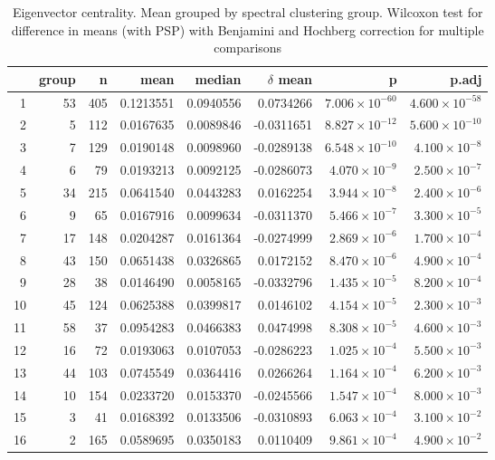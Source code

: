 \begin{table}[ht]
\centering
\begin{tabular}{rrrrrrrr}
  \toprule
 & group & n & mean & median & $\delta$ mean & p & p.adj \\ 
  \midrule
1 & 53 & 405 & 0.1213551 & 0.0940556 & 0.0734266 & $7.006 \times 10^{-60}$ & $4.600 \times 10^{-58}$ \\ 
  2 & 5 & 112 & 0.0167635 & 0.0089846 & -0.0311651 & $8.827 \times 10^{-12}$ & $5.600 \times 10^{-10}$ \\ 
  3 & 7 & 129 & 0.0190148 & 0.0098960 & -0.0289138 & $6.548 \times 10^{-10}$ & $4.100 \times 10^{-8}$ \\ 
  4 & 6 & 79 & 0.0193213 & 0.0092125 & -0.0286073 & $4.070 \times 10^{-9}$ & $2.500 \times 10^{-7}$ \\ 
  5 & 34 & 215 & 0.0641540 & 0.0443283 & 0.0162254 & $3.944 \times 10^{-8}$ & $2.400 \times 10^{-6}$ \\ 
  6 & 9 & 65 & 0.0167916 & 0.0099634 & -0.0311370 & $5.466 \times 10^{-7}$ & $3.300 \times 10^{-5}$ \\ 
  7 & 17 & 148 & 0.0204287 & 0.0161364 & -0.0274999 & $2.869 \times 10^{-6}$ & $1.700 \times 10^{-4}$ \\ 
  8 & 43 & 150 & 0.0651438 & 0.0326865 & 0.0172152 & $8.470 \times 10^{-6}$ & $4.900 \times 10^{-4}$ \\ 
  9 & 28 & 38 & 0.0146490 & 0.0058165 & -0.0332796 & $1.435 \times 10^{-5}$ & $8.200 \times 10^{-4}$ \\ 
  10 & 45 & 124 & 0.0625388 & 0.0399817 & 0.0146102 & $4.154 \times 10^{-5}$ & $2.300 \times 10^{-3}$ \\ 
  11 & 58 & 37 & 0.0954283 & 0.0466383 & 0.0474998 & $8.308 \times 10^{-5}$ & $4.600 \times 10^{-3}$ \\ 
  12 & 16 & 72 & 0.0193063 & 0.0107053 & -0.0286223 & $1.025 \times 10^{-4}$ & $5.500 \times 10^{-3}$ \\ 
  13 & 44 & 103 & 0.0745549 & 0.0364416 & 0.0266264 & $1.164 \times 10^{-4}$ & $6.200 \times 10^{-3}$ \\ 
  14 & 10 & 154 & 0.0233720 & 0.0153370 & -0.0245566 & $1.547 \times 10^{-4}$ & $8.000 \times 10^{-3}$ \\ 
  15 & 3 & 41 & 0.0168392 & 0.0133506 & -0.0310893 & $6.063 \times 10^{-4}$ & $3.100 \times 10^{-2}$ \\ 
  16 & 2 & 165 & 0.0589695 & 0.0350183 & 0.0110409 & $9.861 \times 10^{-4}$ & $4.900 \times 10^{-2}$ \\ 
   \bottomrule
\end{tabular}
\caption[Mean spectral group eigenvector centrality]{Eigenvector centrality. Mean grouped by spectral clustering group. Wilcoxon test for difference in means (with PSP) with Benjamini and Hochberg correction for multiple comparisons} 
\label{tab:eigenvector Wilcoxon}
\end{table}



